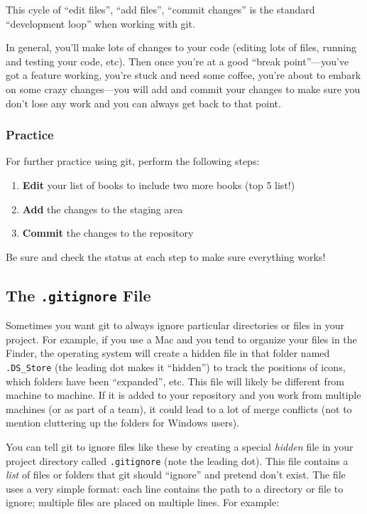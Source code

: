 \documentclass[]{book}
\providecommand{\tightlist}{%
  \setlength{\itemsep}{0pt}\setlength{\parskip}{0pt}}
\theoremstyle{definition}
\theoremstyle{definition}
\theoremstyle{remark}
\begin{document}
This cycle of ``edit files'', ``add files'', ``commit changes'' is the
standard ``development loop'' when working with git.

In general, you'll make lots of changes to your code (editing lots of
files, running and testing your code, etc). Then once you're at a good
``break point''---you've got a feature working, you're stuck and need
some coffee, you're about to embark on some crazy changes---you will add
and commit your changes to make sure you don't lose any work and you can
always get back to that point.

\subsubsection{Practice}\label{practice}

For further practice using git, perform the following steps:

\begin{enumerate}
\def\labelenumi{\arabic{enumi}.}
\tightlist
\item
  \textbf{Edit} your list of books to include two more books (top 5
  list!)
\item
  \textbf{Add} the changes to the staging area
\item
  \textbf{Commit} the changes to the repository
\end{enumerate}

Be sure and check the status at each step to make sure everything works!

\subsection{\texorpdfstring{The \texttt{.gitignore}
File}{The .gitignore File}}\label{the-.gitignore-file}

Sometimes you want git to always ignore particular directories or files
in your project. For example, if you use a Mac and you tend to organize
your files in the Finder, the operating system will create a hidden file
in that folder named \texttt{.DS\_Store} (the leading dot makes it
``hidden'') to track the positions of icons, which folders have been
``expanded'', etc. This file will likely be different from machine to
machine. If it is added to your repository and you work from multiple
machines (or as part of a team), it could lead to a lot of merge
conflicts (not to mention cluttering up the folders for Windows users).

You can tell git to ignore files like these by creating a special
\emph{hidden} file in your project directory called \texttt{.gitignore}
(note the leading dot). This file contains a \emph{list} of files or
folders that git should ``ignore'' and pretend don't exist. The file
uses a very simple format: each line contains the path to a directory or
file to ignore; multiple files are placed on multiple lines. For
example:
\end{document}
